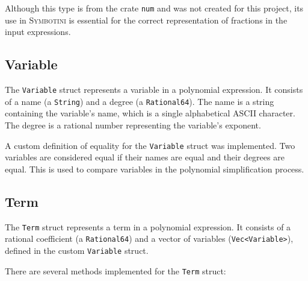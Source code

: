 Although this type is from the crate \verb|num| and was not created for this project, its use in \textsc{Symbotini} is essential for the correct representation of fractions in the input expressions.

\subsection{Variable}\label{subsec:variable}

The \verb|Variable| struct represents a variable in a polynomial expression. It consists of a name (a \verb|String|) and a degree (a \verb|Rational64|). The name is a string containing the variable's name, which is a single alphabetical ASCII character. The degree is a rational number representing the variable's exponent.

A custom definition of equality for the \verb|Variable| struct was implemented. Two variables are considered equal if their names are equal and their degrees are equal. This is used to compare variables in the polynomial simplification process.

\subsection{Term}\label{subsec:term}

The \verb|Term| struct represents a term in a polynomial expression. It consists of a rational coefficient (a \verb|Rational64|) and a vector of variables (\verb|Vec<Variable>|), defined in the custom \texttt{Variable} struct.

There are several methods implemented for the \verb|Term| struct:

